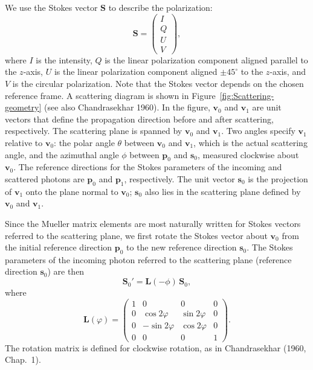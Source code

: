 \documentclass[english,a4paper]{my_memo}
\begin{document}
We use the Stokes vector $\mathbf{S}$ to describe the polarization:
\[
\mathbf{S}=\left(\begin{array}{c}
I\\ Q\\ U\\ V
\end{array}\right),
\]
where $I$ is the intensity, $Q$ is the linear polarization
component aligned parallel to the $z$-axis, $U$ is the linear
polarization component aligned $\pm 45^{\circ}$ to the $z$-axis,
and $V$ is the circular polarization. Note that the Stokes vector
depends on the chosen reference frame. A scattering diagram is
shown in Figure~\ref{fig:Scattering-geometry} (see also
Chandrasekhar 1960). In the figure, $\boldsymbol{v}_{0}$ and
$\boldsymbol{v}_{1}$ are unit vectors that define the propagation
direction before and after scattering, respectively. The
scattering plane is spanned by $\boldsymbol{v}_{0}$ and
$\boldsymbol{v}_{1}$. Two angles specify $\boldsymbol{v}_{1}$ relative to
$\boldsymbol{v}_{0}$: the polar angle $\theta$ between $\boldsymbol{v}_{0}$
and $\boldsymbol{v}_{1}$, which is the actual scattering angle, and
the azimuthal angle $\phi$ between $\mathbf{p}_{0}$ and
$\mathbf{s}_{0}$, measured clockwise about $\boldsymbol{v}_{0}$.
The reference directions for the Stokes parameters of the incoming
and scattered photons are $\mathbf{p}_{0}$ and $\mathbf{p}_{1}$,
respectively. The unit vector $\mathbf{s}_{0}$ is the projection
of $\boldsymbol{v}_{1}$ onto the plane normal to $\boldsymbol{v}_{0}$;
$\mathbf{s}_{0}$ also lies in the scattering plane defined by
$\boldsymbol{v}_{0}$ and $\boldsymbol{v}_{1}$.

Since the Mueller matrix elements are most naturally written for
Stokes vectors referred to the scattering plane, we first rotate
the Stokes vector about $\boldsymbol{v}_{0}$ from the initial
reference direction $\mathbf{p}_{0}$ to the new reference direction
$\mathbf{s}_{0}$. The Stokes parameters of the incoming photon
referred to the scattering plane (reference direction
$\mathbf{s}_{0}$) are then
\[
\mathbf{S}_{0}'=\mathbf{L}(-\phi)\,\mathbf{S}_{0},
\]
where
\[
\mathbf{L}(\varphi)=\left(\begin{array}{cccc}
1 & 0 & 0 & 0\\
0 & \cos2\varphi & \sin2\varphi & 0\\
0 & -\sin2\varphi & \cos2\varphi & 0\\
0 & 0 & 0 & 1
\end{array}\right).
\]
The rotation matrix is defined for clockwise rotation, as in
Chandrasekhar (1960, Chap.~1).
\end{document}

